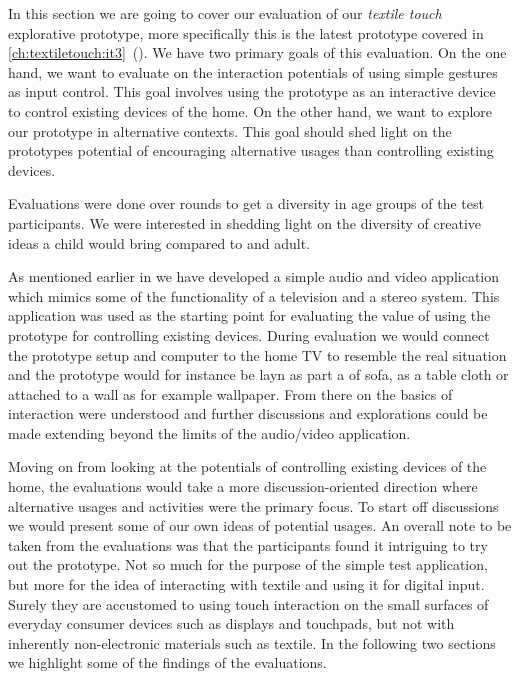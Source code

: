 In this section we are going to cover our evaluation of our \emph{textile touch} explorative prototype, more specifically this is the latest prototype covered in \ref{ch:textiletouch:it3}~().
We have two primary goals of this evaluation.
On the one hand, we want to evaluate on the interaction potentials of using simple gestures as input control.
This goal involves using the prototype as an interactive device to control existing devices of the home.
On the other hand, we want to explore our prototype in alternative contexts.
This goal should shed light on the prototypes potential of encouraging alternative usages than controlling existing devices.

Evaluations were done over  rounds to get a diversity in age groups of the test participants.
We were interested in shedding light on the diversity of creative ideas a child would bring compared to and adult.

\blank
As mentioned earlier in \emph{  } we have developed a simple audio and video application which mimics some of the functionality of a television and a stereo system.
This application was used as the starting point for evaluating the value of using the prototype for controlling existing devices.
During evaluation we would connect the prototype setup and computer to the home TV to resemble the real situation and the prototype would for instance be layn as part a of sofa, as a table cloth or attached to a wall as for example wallpaper.
From there on the basics of interaction were understood and further discussions and explorations could be made extending beyond the limits of the audio/video application.

Moving on from looking at the potentials of controlling existing devices of the home, the evaluations would take a more discussion-oriented direction where alternative usages and activities were the primary focus.
To start off discussions we would present some of our own ideas of potential usages.
\blank
An overall note to be taken from the evaluations was that the participants found it intriguing to try out the prototype.
Not so much for the purpose of the simple test application, but more for the idea of interacting with textile and using it for digital input.
Surely they are accustomed to using touch interaction on the small surfaces of everyday consumer devices such as displays and touchpads, but not with inherently non-electronic materials such as textile. 
\blank
In the following two sections we highlight some of the findings of the evaluations.

